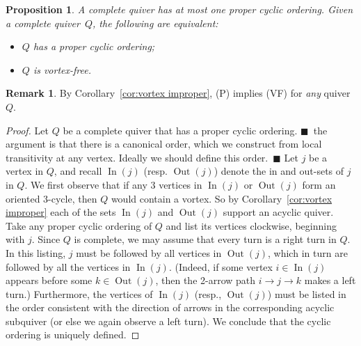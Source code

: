 \documentclass[11pt, letterpaper]{amsart}
\newcommand{\cS}[1]{{\noindent\textsf{\color{purple}$\blacksquare$~#1~$\blacksquare$}}}
\newtheorem{proposition}[theorem]{Proposition}
\theoremstyle{definition}
\newtheorem{remark}[theorem]{Remark}
\numberwithin{equation}{section}
\def\In{{\operatorname{In}}}
\def\Out{{\operatorname{Out}}}
\begin{document}

\begin{proposition} 
\label{prop:vf complete proper }
A complete quiver has at most one proper cyclic ordering. 
Given a complete quiver~$Q$, the following are equivalent:
 \begin{itemize}[leftmargin=1cm] %
\item[{\rm (P)}] $Q$ has a proper cyclic ordering;
\item[{\rm (VF)}] $Q$ is vortex-free.
\end{itemize}
\end{proposition}

\begin{remark}
By Corollary~\ref{cor:vortex improper}, (P) implies (VF) for \emph{any} quiver~$Q$. 
\end{remark}

\iffalse
\begin{proof}
Let $Q$ be a complete quiver that has a proper cyclic ordering. \cS{the argument is that there is a canonical order, which we construct from local transitivity at any vertex. Ideally we should define this order.}
Let $j$ be a vertex in $Q$, and recall $\In(j)$ (resp. $\Out(j)$) denote the in and out-sets of $j$ in $Q$.
We first observe that if any $3$ vertices in $\In(j)$ or $\Out(j)$ form an oriented 3-cycle, then $Q$ would contain a vortex.
So by Corollary~\ref{cor:vortex improper} each of the sets $\In(j)$ and $\Out(j)$ support an acyclic quiver. 
Take any proper cyclic ordering of $Q$ and list its vertices clockwise, beginning with $j$. 
Since $Q$ is complete, we may assume that every turn is a right turn in $Q$.
In this listing, $j$ must be followed by all vertices in $\Out(j)$, which in turn are followed by all the vertices in $\In(j)$. 
(Indeed, if some vertex $i \in \In(j)$ appears before some $k \in \Out(j)$, then the 2-arrow path $i \rightarrow j \rightarrow k$ makes a left turn.) 
Furthermore, the vertices of $\In(j)$ (resp., $\Out(j)$) must be listed in the order consistent with the direction of arrows in the corresponding acyclic subquiver (or else we again observe a left turn). 
We conclude that the cyclic ordering is uniquely defined. 
\end{proof} 
\end{document}

